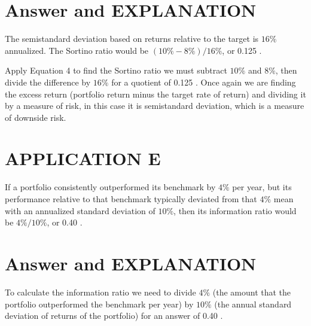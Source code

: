 \documentclass[11pt]{article}
\begin{document}
\section*{Answer and EXPLANATION}
The semistandard deviation based on returns relative to the target is $16 \%$ annualized. The Sortino ratio would be $(10 \%-8 \%) / 16 \%$, or 0.125 .

Apply Equation 4 to find the Sortino ratio we must subtract $10 \%$ and $8 \%$, then divide the difference by $16 \%$ for a quotient of 0.125 . Once again we are finding the excess return (portfolio return minus the target rate of return) and dividing it by a measure of risk, in this case it is semistandard deviation, which is a measure of downside risk.

\section*{APPLICATION E}
If a portfolio consistently outperformed its benchmark by $4 \%$ per year, but its performance relative to that benchmark typically deviated from that $4 \%$ mean with an annualized standard deviation of $10 \%$, then its information ratio would be $4 \% / 10 \%$, or 0.40 .

\section*{Answer and EXPLANATION}
To calculate the information ratio we need to divide $4 \%$ (the amount that the portfolio outperformed the benchmark per year) by $10 \%$ (the annual standard deviation of returns of the portfolio) for an answer of 0.40 .
\end{document}
